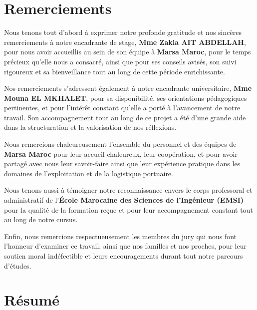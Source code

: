 \documentclass[12pt,a4paper,oneside]{report}
\begin{document}
\chapter*{Remerciements}

Nous tenons tout d'abord à exprimer notre profonde gratitude et nos sincères remerciements à notre encadrante de stage, \textbf{Mme Zakia AIT ABDELLAH}, pour nous avoir accueillis au sein de son équipe à \textbf{Marsa Maroc}, pour le temps précieux qu'elle nous a consacré, ainsi que pour ses conseils avisés, son suivi rigoureux et sa bienveillance tout au long de cette période enrichissante.

Nos remerciements s'adressent également à notre encadrante universitaire, \textbf{Mme Mouna EL MKHALET}, pour sa disponibilité, ses orientations pédagogiques pertinentes, et pour l'intérêt constant qu'elle a porté à l'avancement de notre travail. Son accompagnement tout au long de ce projet a été d'une grande aide dans la structuration et la valorisation de nos réflexions.

Nous remercions chaleureusement l'ensemble du personnel et des équipes de \textbf{Marsa Maroc} pour leur accueil chaleureux, leur coopération, et pour avoir partagé avec nous leur savoir-faire ainsi que leur expérience pratique dans les domaines de l'exploitation et de la logistique portuaire.

Nous tenons aussi à témoigner notre reconnaissance envers le corps professoral et administratif de l'\textbf{École Marocaine des Sciences de l'Ingénieur (EMSI)} pour la qualité de la formation reçue et pour leur accompagnement constant tout au long de notre cursus.

Enfin, nous remercions respectueusement les membres du jury qui nous font l'honneur d'examiner ce travail, ainsi que nos familles et nos proches, pour leur soutien moral indéfectible et leurs encouragements durant tout notre parcours d'études.

\newpage

\chapter*{Résumé}
\end{document}
